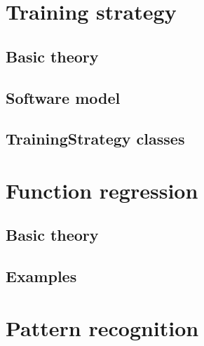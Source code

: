 \documentclass[pdftex, a4paper, 10pt]{book}
\begin{document}
 
\chapter{Training strategy}\label{TrainingStrategy}


\section{Basic theory}\label{TrainingStrategyBasicTheory}


\section{Software model}\label{TrainingStrategySoftwareModel}


\section{TrainingStrategy classes}\label{TrainingStrategyClasses}



\chapter{Function regression}\label{FunctionRegression}


\section{Basic theory}\label{BasicTheoryFunctionRegression}

 
\section{Examples}\label{ExamplesFunctionRegression}


 
\chapter{Pattern recognition}\label{PatternRecognition}

\end{document}

